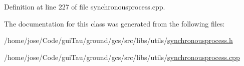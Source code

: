Definition at line 227 of file synchronousprocess.\-cpp.



The documentation for this class was generated from the following files\-:\begin{DoxyCompactItemize}
\item 
/home/jose/\-Code/gui\-Tau/ground/gcs/src/libs/utils/\hyperlink{synchronousprocess_8h}{synchronousprocess.\-h}\item 
/home/jose/\-Code/gui\-Tau/ground/gcs/src/libs/utils/\hyperlink{synchronousprocess_8cpp}{synchronousprocess.\-cpp}\end{DoxyCompactItemize}
